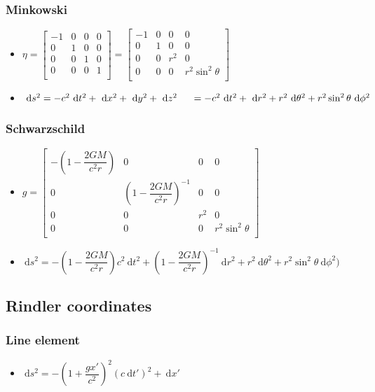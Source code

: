 \documentclass[]{report}
\newcommand \tab[1][1cm]{\hspace*{#1}}
\newcommand{\dn}[1]{\ \mathrm{d}#1}
\newcommand{\itemt}{\item \tab}
\begin{document}
\subsubsection{Minkowski}
\begin{itemize}
\itemt \( \eta =
\begin{bmatrix}
-1 	&0	&0	&0 	\\
0 	&1	&0	&0	\\
0 	&0	&1	&0	\\
0 	&0	&0	&1	\\
\end{bmatrix} =
\begin{bmatrix}
-1 	&0	&0	&0 	\\
0 	&1	&0	&0	\\
0 	&0	&r^2	&0	\\
0 	&0	&0	&r^2 \sin^2 \theta	\\
\end{bmatrix}\)
\itemt \( \dn s^2 = -c^2 \dn t^2 + \dn x^2 + \dn y^2 + \dn z^2 \tab[0.5cm]=  -c^2 \dn t^2 + \dn r^2 + r^2 \dn \theta ^2 + r^2 \sin^2 \theta \dn \phi^2 \)
\end{itemize}

\subsubsection{Schwarzschild}
\begin{itemize}
\itemt \( g =
\begin{bmatrix}
-(1-\dfrac{2GM}{c^2r}) 	&0							&0		&0 					\\
0 						&(1-\dfrac{2GM}{c^2r})^{-1}	&0		&0					\\
0 						&0							&r^2	&0					\\
0 						&0							&0		&r^2\sin^2\theta	\\
\end{bmatrix} \)
\itemt \( \dn s^2 = -(1-\dfrac{2GM}{c^2r})c^2 \dn t^2 + (1-\dfrac{2GM}{c^2r})^{-1} \dn r^2 + r^2 \dn \theta^2 + r^2\sin^2 \theta \dn \phi^2) \)
\end{itemize}

		\subsection{Rindler coordinates}

\subsubsection{Line element}
\begin{itemize}
\itemt \( \dn s^2 = -(1+\dfrac{gx'}{c^2})^2(c \dn t')^2 + \dn x' \)
\end{itemize}
\end{document}
